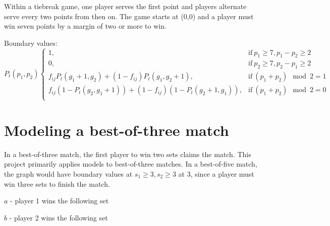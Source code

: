 \documentclass[chapterprefix=false]{report}
\begin{document}
Within a tiebreak game, one player serves the first point and players alternate serve every two points from then on. The game starts at (0,0) and a player must win seven points by a margin of two or more to win.

Boundary values:
\begin{equation}
    P_t(p_1,p_2) 
    \begin{cases}
      1, & \text{if}\ p_1 \geq 7,p_1-p_2 \geq 2 \\
      0, & \text{if}\ p_2 \geq 7,p_2-p_1 \geq 2 \\
      f_{ij}P_t(g_1+1,g_2)+(1-f_{ij})P_t(g_1,g_2+1), & \text{if}\ (p_1+p_2) \mod 2 = 1 \\
f_{ij}(1-P_t(g_2,g_1+1))+(1-f_{ij})(1-P_t(g_2+1,g_1)), & \text{if}\ (p_1+p_2) \mod 2 = 0 \\
    \end{cases}
  \end{equation}

\section{Modeling a best-of-three match}

In a best-of-three match, the first player to win two sets claims the match. This project primarily applies models to best-of-three matches. In a best-of-five match, the graph would have boundary values at $s_1 \geq 3, s_2 \geq 3$ at 3, since a player must win three sets to finish the match. 

$a$ - player 1 wins the following set

$b$ - player 2 wins the following set

\end{document}
